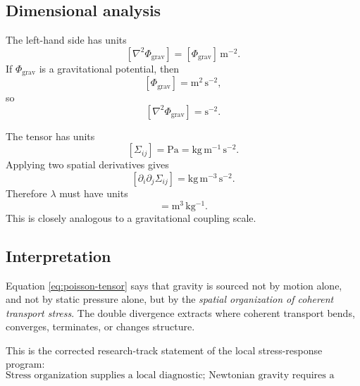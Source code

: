 \documentclass[11pt]{article}
\newcommand{\grav}{\mathrm{grav}}
\begin{document}
        \subsection{Dimensional analysis}
            
            The left-hand side has units
            \[
                [\nabla^2 \Phi_{\grav}] = [\Phi_{\grav}]\,\mathrm{m^{-2}}.
            \]
            If \(\Phi_{\grav}\) is a gravitational potential, then
            \[
                [\Phi_{\grav}] = \mathrm{m^2\,s^{-2}},
            \]
            so
            \[
                [\nabla^2 \Phi_{\grav}] = \mathrm{s^{-2}}.
            \]
            
            The tensor has units
            \[
                [\Sigma_{ij}] = \mathrm{Pa} = \mathrm{kg\,m^{-1}\,s^{-2}}.
            \]
            Applying two spatial derivatives gives
            \[
                [\partial_i\partial_j \Sigma_{ij}]
                =
                \mathrm{kg\,m^{-3}\,s^{-2}}.
            \]
            Therefore \(\lambda\) must have units
            \begin{equation}
                [\lambda] = \mathrm{m^3\,kg^{-1}}.
                \label{eq:lambda-units}
            \end{equation}
            This is closely analogous to a gravitational coupling scale.
        
        \subsection{Interpretation}
            
            Equation \eqref{eq:poisson-tensor} says that gravity is sourced not by motion alone, and not by static pressure alone, but by the \emph{spatial organization of coherent transport stress}. The double divergence extracts where coherent transport bends, converges, terminates, or changes structure.
            
            This is the corrected research-track statement of the local stress-response program:
            \begin{equation}
                \boxed{
                    \text{Stress organization supplies a local diagnostic; Newtonian gravity requires a monopole-bearing density or boundary source.}
                }
                \label{eq:program-statement}
            \end{equation}
\end{document}
